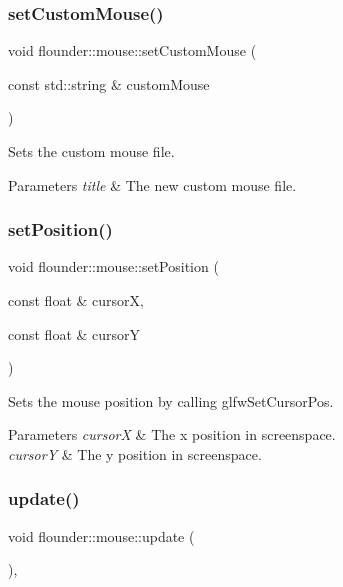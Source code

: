 \subsubsection{\texorpdfstring{set\+Custom\+Mouse()}{setCustomMouse()}}
{\footnotesize\ttfamily void flounder\+::mouse\+::set\+Custom\+Mouse (\begin{DoxyParamCaption}\item[{const std\+::string \&}]{custom\+Mouse }\end{DoxyParamCaption})}



Sets the custom mouse file. 


\begin{DoxyParams}{Parameters}
{\em title} & The new custom mouse file. \\
\hline
\end{DoxyParams}
\mbox{\label{classflounder_1_1mouse_a8b79257481a09d821cc0dd52a2729d5f}} 
\subsubsection{\texorpdfstring{set\+Position()}{setPosition()}}
{\footnotesize\ttfamily void flounder\+::mouse\+::set\+Position (\begin{DoxyParamCaption}\item[{const float \&}]{cursorX,  }\item[{const float \&}]{cursorY }\end{DoxyParamCaption})}



Sets the mouse position by calling glfw\+Set\+Cursor\+Pos. 


\begin{DoxyParams}{Parameters}
{\em cursorX} & The x position in screenspace. \\
\hline
{\em cursorY} & The y position in screenspace. \\
\hline
\end{DoxyParams}
\mbox{\label{classflounder_1_1mouse_aa1b1d60e1d1cf4ec7d19eaef65e040bc}} 
\subsubsection{\texorpdfstring{update()}{update()}}
{\footnotesize\ttfamily void flounder\+::mouse\+::update (\begin{DoxyParamCaption}{ }\end{DoxyParamCaption})\hspace{0.3cm}{\ttfamily [override]}, {\ttfamily [virtual]}}



